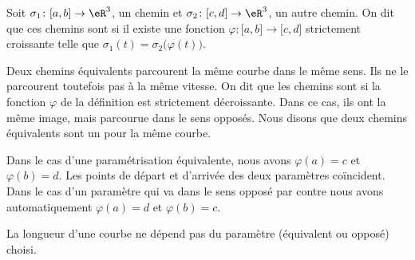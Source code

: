 \begin{definition}
    Soit $\sigma_1\colon \mathopen[ a , b \mathclose]\to \eR^3$, un chemin et $\sigma_2\colon \mathopen[ c , d \mathclose]\to \eR^3$, un autre chemin. On dit que ces chemins sont  si il existe une fonction $\varphi\colon \mathopen[ a , b \mathclose]\to \mathopen[ c , d \mathclose]$ strictement croissante telle que $\sigma_1(t)=\sigma_2\big( \varphi(t) \big)$.
\end{definition}

Deux chemins équivalents parcourent la même courbe dans le même sens. Ils ne le parcourent toutefois pas à la même vitesse. On dit que les chemins sont  si la fonction $\varphi$ de la définition est strictement décroissante. Dans ce cas, ils ont la même image, mais parcourue dans le sens opposés. Nous disons que deux chemins équivalents sont un  pour la même courbe.

 Dans le cas d'une paramétrisation équivalente, nous avons $\varphi(a)=c$ et $\varphi(b)=d$. Les points de départ et d'arrivée des deux paramètres coïncident. Dans le cas d'un paramètre qui va dans le sens opposé par contre nous avons automatiquement $\varphi(a)=d$ et $\varphi(b)=c$.

\begin{proposition}
    La longueur d'une courbe ne dépend pas du paramètre (équivalent ou opposé) choisi.
\end{proposition}

